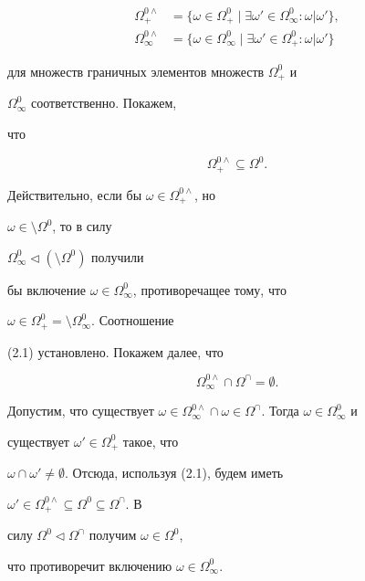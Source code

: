 \begin{pf}
\begin{align*}
\Omega^{0\wedge}_+&=\{\omega\in\Omega^0_+\mid\exists 


\omega'\in\Omega^0_\infty:\omega|\omega'\},\\ 


\Omega^{0\wedge}_\infty&=\{\omega\in\Omega^0_\infty\mid 


\exists\omega'\in\Omega^0_+:\omega|\omega'\} 


\end{align*} 


для множеств граничных элементов множеств $\Omega^0_+$ и 


$\Omega^0_\infty$ соответственно. Покажем, 


что 


\begin{equation} 


\Omega^{0\wedge}_+\subseteq\Omega^0. 


\end{equation} 


Действительно, если бы $\omega\in\Omega^{0\wedge}_+$, но 


$\omega\in\setminus\Omega^0$, то в силу 


$\Omega^0_\infty\vartriangleleft(\setminus\Omega^0)$ получили 


бы включение $\omega\in\Omega^0_\infty$, противоречащее тому, что 


$\omega\in\Omega^0_+=\setminus\Omega^0_\infty$. Соотношение 


(2.1) установлено. Покажем далее, что 


\begin{equation} 


\Omega^{0\wedge}_\infty\cap\Omega^\cap=\emptyset. 


\end{equation} 


Допустим, что существует $\omega\in\Omega^{0\wedge}_\infty\cap 


\omega\in\Omega^\cap$. Тогда $\omega\in\Omega^0_\infty$ и 


существует $\omega'\in\Omega^0_+$ такое, что 


$\omega\cap\omega'\ne\emptyset$. Отсюда, используя (2.1), будем иметь 


$\omega'\in\Omega^{0\wedge}_+\subseteq\Omega^0\subseteq\Omega^\cap$. В 


силу $\Omega^0\vartriangleleft\Omega^\cap$ получим $\omega\in\Omega^0$, 


что противоречит включению $\omega\in\Omega^0_\infty$. 



\end{pf}
